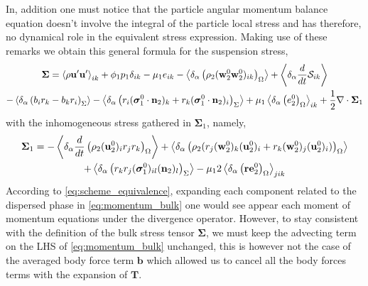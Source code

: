 In, addition one must notice that the particle angular momentum balance equation doesn't involve the integral of the particle local stress and has therefore, no dynamical role in the equivalent stress expression. 
Making use of these remarks we obtain this general formula for the suspension stress,  
\begin{multline*}
    \bm{\Sigma}
    = \left<\rho\textbf{u}'\textbf{u}'\right>_{ik}
    + \phi_1 p_1 \delta_{ik}
    - \mu_1 e_{ik}
    - \left<\delta_\alpha \left(  \rho_2 (\textbf{w}_2^0\textbf{w}_2^0  )_{ik} \right)_\Omega\right>
    + \left<\delta_\alpha \frac{d}{d t} \mathcal{S}_{ik} \right>\\
    - \left<\delta_\alpha \left(  b_{i}r_k - b_{k}r_i  \right)_\Sigma\right>
    - \left<\delta_\alpha \left(  r_i (\bm{\sigma}_1^0 \cdot \textbf{n}_2)_{k}
    + r_k (\bm{\sigma}_1^0 \cdot \textbf{n}_2)_{i} \right)_\Sigma\right>
    + \mu_1 \left<\delta_\alpha \left( e_2^0 \right)_\Omega\right>_{ik}
    + \frac{1}{2} \mathbf{\nabla}\cdot\bm{\Sigma}_1
\end{multline*}
with the inhomogeneous stress gathered in $\bm{\Sigma}_1$, namely,
\begin{multline}
    \bm{\Sigma}_1
    = 
    - \left<\delta_\alpha \frac{d}{d t}\left(  \rho_2 (\textbf{u}_2^0)_i r_j r_k  \right)_\Omega\right>
    + \left<\delta_\alpha \left(  \rho_2 (r_{j} (\textbf{w}_2^0)_k (\textbf{u}^0_2)_i + r_k (\textbf{w}_2^0)_j (\textbf{u}^0_2)_i) \right)_\Omega\right>\nonumber\\
    +\left<\delta_\alpha \left(   r_{k}r_{j} (\bm{\sigma}_1^0)_{il} (\textbf{n}_2)_l  \right)_\Sigma\right>
    - \mu_1 2 \left<\delta_\alpha \left( \textbf{r} \textbf{e}_2^0 \right)_\Omega\right>_{jik}
\end{multline}
According to \ref{eq:scheme_equivalence}, expanding each component related to the dispersed phase in \ref{eq:momentum_bulk} one would see appear each moment of momentum equations under the divergence operator.
However, to stay consistent with the definition of the bulk stress tensor $\bm{\Sigma}$, we must keep the advecting term on the LHS of \ref{eq:momentum_bulk} unchanged, this is however not the case of the averaged body force term $\textbf{b}$ which allowed us to cancel all the body forces terms with the expansion of $\textbf{T}$.  

